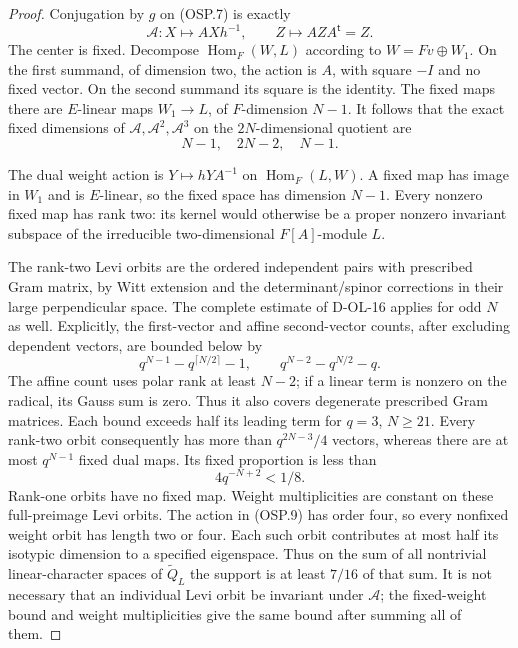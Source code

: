 \begin{proof}
Conjugation by $g$ on (OSP.7) is exactly
\[
 \mathcal A:X\longmapsto AXh^{-1},\qquad
 Z\longmapsto AZA^{\mathsf t}=Z.                            \tag{OSP.9}
\]
The center is fixed.  Decompose
$\operatorname{Hom}_F(W,L)$ according to $W=Fv\oplus W_1$.
On the first summand, of dimension two, the action is $A$,
with square $-I$ and no fixed vector.  On the second summand
its square is the identity.  The fixed maps there are
$E$-linear maps $W_1\to L$, of $F$-dimension $N-1$.
It follows that the exact fixed dimensions of
$\mathcal A,\mathcal A^2,\mathcal A^3$ on the $2N$-dimensional
quotient are
\[
                              N-1,\quad 2N-2,\quad N-1.    \tag{OSP.10}
\]

The dual weight action is $Y\mapsto hYA^{-1}$ on
$\operatorname{Hom}_F(L,W)$.  A fixed map has image in $W_1$
and is $E$-linear, so the fixed space has dimension $N-1$.
Every nonzero fixed map has rank two: its kernel would otherwise
be a proper nonzero invariant subspace of the irreducible
two-dimensional $F[A]$-module $L$.

The rank-two Levi orbits are the ordered independent pairs
with prescribed Gram matrix, by Witt extension and the
determinant/spinor corrections in their large perpendicular
space.  The complete estimate of D-OL-16 applies for odd $N$
as well.  Explicitly, the first-vector and affine second-vector
counts, after excluding dependent vectors, are bounded below by
\[
 q^{N-1}-q^{\lceil N/2\rceil}-1,\qquad
 q^{N-2}-q^{N/2}-q.                                       \tag{OSP.11}
\]
The affine count uses polar rank at least $N-2$; if a
linear term is nonzero on the radical, its Gauss sum is zero.
Thus it also covers degenerate prescribed Gram matrices.
Each bound exceeds half its leading term for $q=3$, $N\ge21$.
Every rank-two orbit consequently has more than $q^{2N-3}/4$
vectors, whereas there are at most $q^{N-1}$ fixed dual maps.
Its fixed proportion is less than
\[
                              4q^{-N+2}<1/8.               \tag{OSP.12}
\]
Rank-one orbits have no fixed map.  Weight multiplicities are
constant on these full-preimage Levi orbits.
The action in (OSP.9) has order four, so every nonfixed
weight orbit has length two or four.  Each such orbit contributes
at most half its isotypic dimension to a specified eigenspace.
Thus on the sum of all nontrivial linear-character spaces of
$\widetilde Q_L$ the support is at least $7/16$ of that sum.
It is not necessary that an individual Levi orbit be invariant
under $\mathcal A$; the fixed-weight bound and weight
multiplicities give the same bound after summing all of them.


\end{proof}
